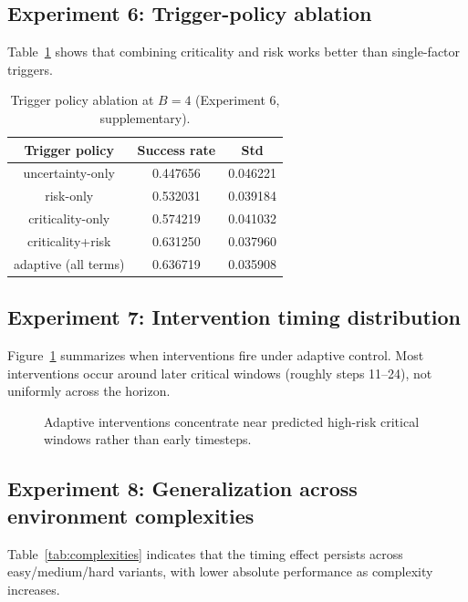 \documentclass{article}
\begin{document}
\subsection{Experiment 6: Trigger-policy ablation}
Table~\ref{tab:trigger} shows that combining criticality and risk works better than single-factor triggers.

\begin{table}[t]
\centering
\caption{Trigger policy ablation at $B{=}4$ (Experiment 6, supplementary).}
\label{tab:trigger}
\begin{tabular}{ccc}
\toprule
Trigger policy & Success rate & Std \\
\midrule
uncertainty-only & 0.447656 & 0.046221 \\
risk-only & 0.532031 & 0.039184 \\
criticality-only & 0.574219 & 0.041032 \\
criticality+risk & 0.631250 & 0.037960 \\
adaptive (all terms) & 0.636719 & 0.035908 \\
\bottomrule
\end{tabular}
\end{table}

\subsection{Experiment 7: Intervention timing distribution}
Figure~\ref{fig:timing_hist} summarizes when interventions fire under adaptive control. Most interventions occur around later critical windows (roughly steps 11--24), not uniformly across the horizon.

\begin{figure}[t]
\centering
{}
\caption{Adaptive interventions concentrate near predicted high-risk critical windows rather than early timesteps.}
\label{fig:timing_hist}
\end{figure}

\subsection{Experiment 8: Generalization across environment complexities}
Table~\ref{tab:complexities} indicates that the timing effect persists across easy/medium/hard variants, with lower absolute performance as complexity increases.
\end{document}
